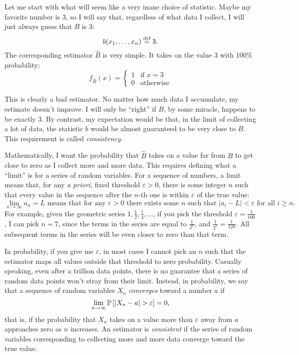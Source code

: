 Let me start with what will seem like a very inane choice of statistic.
Maybe my favorite number is 3, so I will say that, regardless of what data I
collect, I will just always guess that $B$ is 3:
\begin{equation*}
    b(x_1, \ldots, x_n) \stackrel{\text{def}}{=} 3.
\end{equation*}
The corresponding estimator $\hat{B}$ is very simple. It takes on the
value 3 with 100\% probability:
\begin{equation*}
    f_{\hat{B}}(x) = \begin{cases}
        1 &\text{if $x = 3$} \\
        0 &\text{otherwise}
    \end{cases}
\end{equation*}

This is clearly a bad estimator. No matter how much data I accumulate, my
estimate doesn't improve. I will only be ``right'' if $B$, by some miracle,
happens to be exactly $3$. By contrast, my expectation would be that, in
the limit of collecting a lot of data, the statistic $b$ would be almost
guaranteed to be very close to $B$. This requirement is called \emph{consistency}.

Mathematically, I want the probability that $\hat{B}$ takes on a value far from $B$ to get close to zero as I collect more and more data. This requires defining what a ``limit'' is for a series of random variables. For a sequence of numbers, a limit means that, for any \textit{a priori}, fixed threshold $\varepsilon > 0$, there is some integer $n$ such that every value in the sequence after the $n$-th one is within $\varepsilon$ of the true value:
\begin{equation*}
    \lim_{n\to\infty} a_n = L \text{ means that for any $\varepsilon > 0$ there exists some $n$ such that } |a_i - L| < \varepsilon \text{ for all $i \geq n$}.
\end{equation*}
For example, given the geometric series $1, \tfrac{1}{2}, \tfrac{1}{4}, \ldots$,
if you pick the threshold $\varepsilon = \tfrac{1}{100}$, I can pick $n=7$, since the terms in the series are equal to $\tfrac{1}{2^n}$, and $\tfrac{1}{2^7} = \tfrac{1}{128}$. All subsequent terms in the series will be even closer to zero than that term.

In probability, if you give me $\varepsilon$, in most cases I cannot pick an
$n$ such that the estimator maps all values outside that threshold to zero probability.
Casually speaking, even after a trillion data points, there is no guarantee that
a series of random data points won't stray from their limit.
Instead, in probability, we say that a sequence of random variables $X_n$
\emph{converges} toward a number $a$ if
\begin{equation}
\lim_{n \to \infty} \mathbb{P}\left[{|X_n - a| > \varepsilon}\right] = 0,
\end{equation}
that is, if the probability that $X_n$
takes on a value more than $\varepsilon$ away from $a$ approaches zero as $n$
increases. An estimator is \emph{consistent} if the series of random variables
corresponding to collecting more and more data converge toward the true value.

